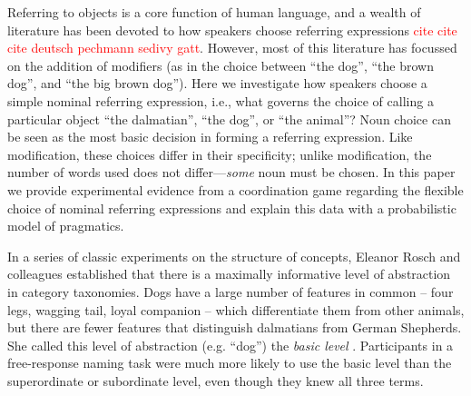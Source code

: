 \documentclass[10pt,letterpaper]{article}
\newcommand{\red}[1]{\textcolor{Red}{#1}}
\begin{document}
Referring to objects is a core function of human language, and a wealth of literature has been devoted to how speakers choose referring expressions \red{cite cite cite deutsch pechmann sedivy gatt}. 
However, most of this literature has focussed on the addition of modifiers (as in the choice between ``the dog'', ``the brown dog'', and ``the big brown dog''). Here we investigate how speakers choose a simple nominal referring expression, i.e., what governs the choice of calling a particular object ``the dalmatian'', ``the dog'', or ``the animal''? 
Noun choice can be seen as the most basic decision in forming a referring expression.
Like modification, these choices differ in their specificity; unlike modification, the number of words used does not differ---\emph{some} noun must be chosen.
In this paper we provide experimental evidence from a coordination game regarding the flexible choice of nominal referring expressions and explain this data with a probabilistic model of pragmatics.


In a series of classic experiments on the structure of concepts, Eleanor Rosch and colleagues established that there is a maximally informative level of abstraction in category taxonomies. Dogs have a large number of features in common -- four legs, wagging tail, loyal companion -- which differentiate them from other animals, but there are fewer features that distinguish dalmatians from German Shepherds. She called this level of abstraction (e.g. ``dog'') the \emph{basic level} \cite{RoschEtAl76_BasicLevel}. Participants in a free-response naming task were much more likely to use the basic level than the superordinate or subordinate level, even though they knew all three terms. 
\end{document}
